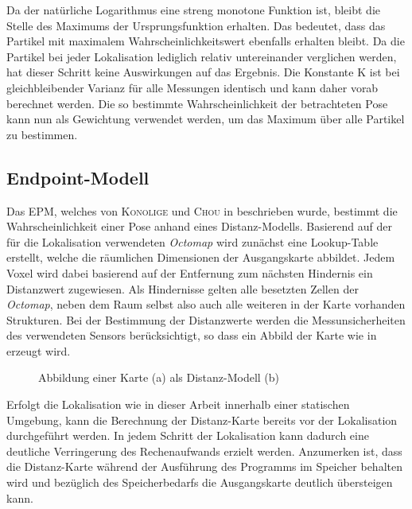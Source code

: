 \prever{
}
Da der natürliche Logarithmus eine streng monotone Funktion ist, bleibt die Stelle des Maximums der Ursprungsfunktion erhalten. Das bedeutet, dass das Partikel mit maximalem Wahrscheinlichkeitswert ebenfalls erhalten bleibt. Da die Partikel bei jeder Lokalisation lediglich relativ untereinander verglichen werden, hat dieser Schritt keine Auswirkungen auf das Ergebnis. Die Konstante $\mathrm{K}$ ist bei gleichbleibender Varianz für alle Messungen identisch und kann daher vorab berechnet werden. Die so bestimmte Wahrscheinlichkeit der betrachteten Pose kann nun als Gewichtung verwendet werden, um das Maximum über alle Partikel zu bestimmen. 

\subsection{Endpoint-Modell}
Das EPM, welches von \textsc{Konolige} und \textsc{Chou} in \cite{Konolige1999} beschrieben wurde, bestimmt die Wahrscheinlichkeit einer Pose anhand eines Distanz-Modells. Basierend auf der für die Lokalisation verwendeten \textit{Octomap} wird zunächst eine Lookup-Table erstellt, welche die räumlichen Dimensionen der Ausgangskarte abbildet. Jedem Voxel wird dabei basierend auf der Entfernung zum nächsten Hindernis ein Distanzwert zugewiesen. Als Hindernisse gelten alle besetzten Zellen der \textit{Octomap}, neben dem Raum selbst also auch alle weiteren in der Karte vorhanden Strukturen. Bei der Bestimmung der Distanzwerte werden die Messunsicherheiten des verwendeten Sensors berücksichtigt, so dass ein Abbild der Karte wie in  erzeugt wird.\\

\begin{figure}[!ht]
	\begin{center}
	
	\hspace{5mm}
	\caption{Abbildung einer Karte (a) als Distanz-Modell (b)}
	\label{fig.dist_map}
	\end{center}
\end{figure}

Erfolgt die Lokalisation wie in dieser Arbeit innerhalb einer statischen Umgebung, kann die Berechnung der Distanz-Karte bereits vor der Lokalisation durchgeführt werden. In jedem Schritt der Lokalisation kann dadurch eine deutliche Verringerung des Rechenaufwands erzielt werden. Anzumerken ist, dass die Distanz-Karte während der Ausführung des Programms im Speicher behalten wird und bezüglich des Speicherbedarfs die Ausgangskarte deutlich übersteigen kann.\\

